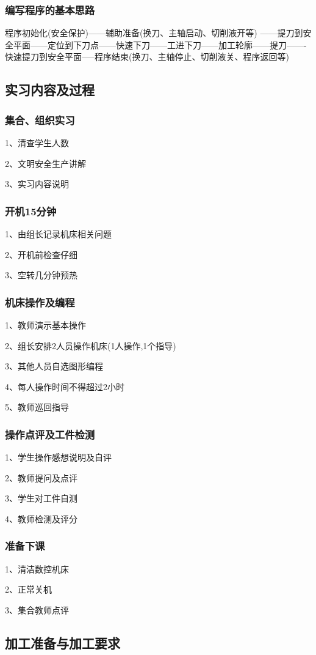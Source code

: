 \subsubsection{编写程序的基本思路}
程序初始化(安全保护)------辅助准备(换刀、主轴启动、切削液开等) ------提刀到安全平面------定位到下刀点------快速下刀------工进下刀------加工轮廓------提刀-------快速提刀到安全平面-----程序结束(换刀、主轴停止、切削液关、程序返回等)


\subsection{实习内容及过程}

\subsubsection{集合、组织实习}
1、清查学生人数

2、文明安全生产讲解

3、实习内容说明
\subsubsection{开机15分钟}
1、由组长记录机床相关问题

2、开机前检查仔细

3、空转几分钟预热
\subsubsection{机床操作及编程}
1、教师演示基本操作

2、组长安排2人员操作机床(1人操作,1个指导)

3、其他人员自选图形编程

4、每人操作时间不得超过2小时

5、教师巡回指导
\subsubsection{操作点评及工件检测}
1、学生操作感想说明及自评

2、教师提问及点评

3、学生对工件自测

4、教师检测及评分
\subsubsection{准备下课}
1、清洁数控机床

2、正常关机

3、集合教师点评


\vfill
\subsection{加工准备与加工要求}

